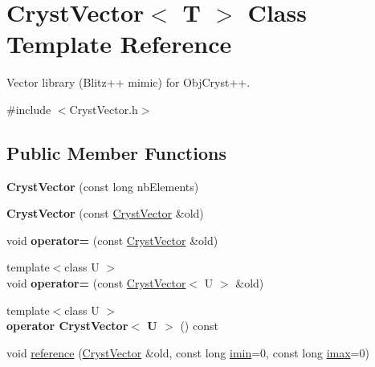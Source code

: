 \hypertarget{class_cryst_vector}{}\section{Cryst\+Vector$<$ T $>$ Class Template Reference}
\label{class_cryst_vector}


Vector library (Blitz++ mimic) for Obj\+Cryst++.  




{\ttfamily \#include $<$Cryst\+Vector.\+h$>$}

\subsection*{Public Member Functions}
\begin{DoxyCompactItemize}
\item 
\mbox{\label{class_cryst_vector_acc1f58f22cbc277dd3ed69583abad959}} 
{\bfseries Cryst\+Vector} (const long nb\+Elements)
\item 
\mbox{\label{class_cryst_vector_a3c796d63fafeee6a9d214536957cf3c9}} 
{\bfseries Cryst\+Vector} (const \mbox{\hyperlink{class_cryst_vector}{Cryst\+Vector}} \&old)
\item 
\mbox{\label{class_cryst_vector_a89708875b6c53d500c19c99b84d02f8a}} 
void {\bfseries operator=} (const \mbox{\hyperlink{class_cryst_vector}{Cryst\+Vector}} \&old)
\item 
\mbox{\label{class_cryst_vector_a8eb89869790a21467967129944248fbd}} 
{\footnotesize template$<$class U $>$ }\\void {\bfseries operator=} (const \mbox{\hyperlink{class_cryst_vector}{Cryst\+Vector}}$<$ U $>$ \&old)
\item 
\mbox{\label{class_cryst_vector_aa02f31054267a62b0f73bcb1173be524}} 
{\footnotesize template$<$class U $>$ }\\{\bfseries operator Cryst\+Vector$<$ U $>$} () const
\item 
void \mbox{\hyperlink{class_cryst_vector_a9f939ab8555eaa1ef838ad5b25dde2d8}{reference}} (\mbox{\hyperlink{class_cryst_vector}{Cryst\+Vector}} \&old, const long \mbox{\hyperlink{class_cryst_vector_a8d5e6eef9202504b306ca7b691162baf}{imin}}=0, const long \mbox{\hyperlink{class_cryst_vector_a5a30304d5f29ab47d499e59003a05a11}{imax}}=0)

\end{DoxyCompactItemize}
